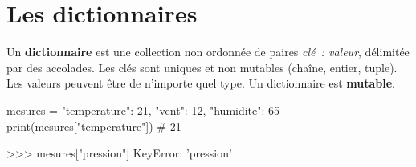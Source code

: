\section{Les dictionnaires}
\label{sec:dictionnaires}


\begin{nxdef}[D9]
  Un \textbf{dictionnaire} est une collection non ordonnée de paires \emph{clé~: valeur},
  délimitée par des accolades. Les clés sont uniques et non mutables (chaîne, entier, tuple).
  Les valeurs peuvent être de n'importe quel type. Un dictionnaire est \textbf{mutable}.
\end{nxdef}


\begin{python}
mesures = {"temperature": 21, "vent": 12, "humidite": 65}
print(mesures["temperature"])  # 21
\end{python}



\begin{console}
>>> mesures["pression"]
KeyError: 'pression'
\end{console}



